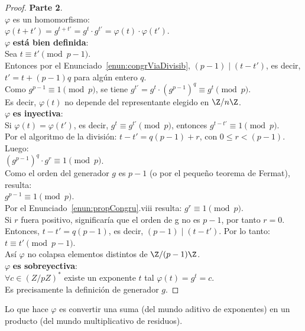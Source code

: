 \begin{proof} \textbf{Parte 2}. \\
$\varphi$ es un homomorfismo: \\
$\varphi(t+t') = g^{t+t'} = g^t\cdot g^{t'} = \varphi(t)\cdot\varphi(t')$. \\
$\varphi$ \textbf{está bien definida}: \\
Sea $t\equiv t'\pmod {p-1}$. \\
Entonces por el Enunciado~\ref{enun:congrViaDivisib}, $(p-1) \mid (t-t')$, es decir, $t'=t+(p-1)q$ para algún entero $q$. \\
Como $g^{p-1} \equiv 1 \pmod p$, se tiene $g^{t'}=g^t \cdot (g^{p-1})^q \equiv g^t\pmod p$. \\
Es decir, $\varphi(t)$ no depende del representante elegido en $\Z/n\Z$. \\
$\varphi$ \textbf{es inyectiva}: \\
Si $\varphi(t)=\varphi(t')$, es decir, $g^t\equiv g^{t'}\pmod p$, entonces $g^{t-t'}\equiv1 \pmod p$. \\
Por el algoritmo de la división: $t-t' = q(p-1)+r$, con $0 \leq r < (p-1)$. Luego: \\
$(g^{p-1})^q \cdot g^r \equiv 1 \pmod p$. \\
Como el orden del generador $g$ es $p-1$ (o por el pequeño teorema de Fermat), resulta: \\
$g^{p-1} \equiv 1 \pmod p$. \\
Por el Enunciado~\ref{enun:propCongru}.viii resulta: $g^r \equiv 1 \pmod p$. \\
Si $r$ fuera positivo, significaría que el orden de g no es $p-1$, por tanto $r=0$. \\
Entonces, $t-t' = q(p-1)$, es decir, $(p-1) \mid (t-t')$. Por lo tanto: \\ 
$t \equiv t' \pmod {p-1}$. \\
Así $\varphi$ no colapsa elementos distintos de $\Z/(p-1)\Z$. \\
$\varphi$ \textbf{es sobreyectiva}: \\
$\forall c \in (Z/pZ)^{*}$ existe un exponente $t$ tal $\varphi(t) = g^t = c$. \\
Es precisamente la definición de generador $g$.
\end{proof}

Lo que hace $\varphi$ es convertir una suma (del mundo aditivo de exponentes) en un producto (del mundo multiplicativo de residuos).\\

